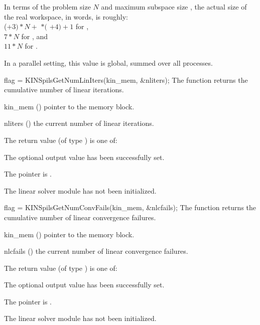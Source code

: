 {
  In terms of the problem size $N$ and maximum subspace size , 
  the actual size of the real workspace, in words, is roughly:\\
  ($+ 3)*N +$  $*($ $ + 4) + 1$ for {\kinspgmr},\\
  $7*N$  for {\kinspbcg}, and \\
  $11*N$ for {\kinsptfqmr}.

  In a parallel setting, this value is global, summed over all processes.
}
{
  flag = KINSpilsGetNumLinIters(kin\_mem, \&nliters);
}
{
  The function  returns the
  cumulative number of linear iterations.
}
{
  \begin{args}
  \item[kin\_mem] ()
    pointer to the {\kinsol} memory block.
  \item[nliters] ()
    the current number of linear iterations.
  \end{args}
}
{
  The return value  (of type ) is one of:
  \begin{args}
  \item[\Id{KINSPILS\_SUCCESS}] 
    The optional output value has been successfully set.
  \item[\Id{KINSPILS\_MEM\_NULL}]
    The  pointer is .
  \item[\Id{KINSPLIS\_LMEM\_NULL}]
    The linear solver module has not been initialized.
  \end{args}
}
{}
{
  flag = KINSpilsGetNumConvFails(kin\_mem, \&nlcfails);
}
{
  The function  returns the
  cumulative number of linear convergence failures.
}
{
  \begin{args}
  \item[kin\_mem] ()
    pointer to the {\kinsol} memory block.
  \item[nlcfails] ()
    the current number of linear convergence failures.
  \end{args}
}
{
  The return value  (of type ) is one of:
  \begin{args}
  \item[\Id{KINSPILS\_SUCCESS}] 
    The optional output value has been successfully set.
  \item[\Id{KINSPILS\_MEM\_NULL}]
    The  pointer is .
  \item[\Id{KINSPILS\_LMEM\_NULL}]
    The linear solver module has not been initialized.
  \end{args}
}

